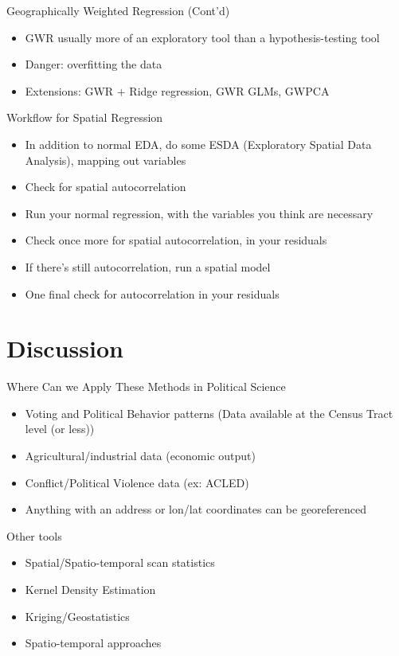 \documentclass[aspectratio = 169, 12pt]{beamer}\usepackage[]{graphicx}\usepackage[]{color}
\begin{document}
\begin{frame}{Geographically Weighted Regression (Cont'd)}
\begin{itemize}
\item GWR usually more of an exploratory tool than a hypothesis-testing tool
\item Danger: overfitting the data
\item Extensions: GWR $+$ Ridge regression, GWR GLMs, GWPCA
\end{itemize}
\end{frame}


\begin{frame}{Workflow for Spatial Regression}
\begin{itemize}
\item In addition to normal EDA, do some ESDA (Exploratory Spatial Data Analysis), mapping out variables
\item Check for spatial autocorrelation
\item Run your normal regression, with the variables you think are necessary
\item Check once more for spatial autocorrelation, in your residuals
\item If there's still autocorrelation, run a spatial model
\item One final check for autocorrelation in your residuals
\end{itemize}
\end{frame}

\section{Discussion}
\begin{frame}{Where Can we Apply These Methods in Political Science}
\begin{itemize}
\item Voting and Political Behavior patterns (Data available at the Census Tract level (or less))
\item Agricultural/industrial data (economic output)
\item Conflict/Political Violence data (ex: ACLED)
\item Anything with an address or lon/lat coordinates can be georeferenced
\end{itemize}
\end{frame}

\begin{frame}{Other tools}
\begin{itemize}
\item Spatial/Spatio-temporal scan statistics
\item Kernel Density Estimation
\item Kriging/Geostatistics
\item Spatio-temporal approaches
\end{itemize}
\end{frame}
\end{document}
